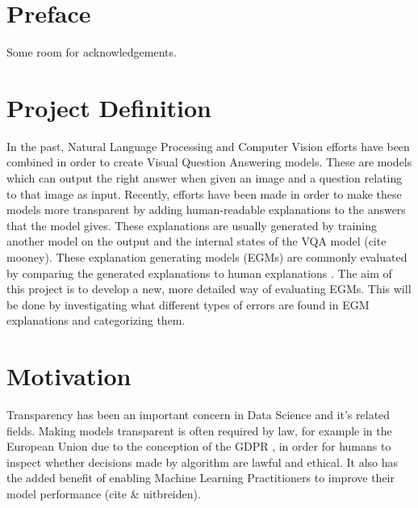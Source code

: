 
\section*{Preface}
Some room for acknowledgements.


\begin{abstract}

\end{abstract}

\section{Project Definition}

In the past, Natural Language Processing and Computer Vision efforts have been combined in order to create Visual Question Answering models. These are models which can output the right answer when given an image and a question relating to that image as input. Recently, efforts have been made in order to make these models more transparent by adding human-readable explanations to the answers that the model gives. These explanations are usually generated by training another model on the output and the internal states of the VQA model (cite mooney). These explanation generating models (EGMs) are commonly evaluated by comparing the generated explanations to human explanations \cite{wu_faithful_2019}. The aim of this project is  to develop a new, more detailed way of evaluating EGMs. This will be done by investigating what different types of errors are found in EGM explanations and categorizing them.

\section{Motivation}

Transparency has been an important concern in Data Science and it's related fields. Making models transparent is often required by law, for example in the European Union due to the conception of the GDPR \cite{noauthor_regulation_2016}, in order for humans to inspect whether decisions made by algorithm are lawful and ethical. It also has the added benefit of enabling Machine Learning Practitioners to improve their model performance (cite \& uitbreiden).

